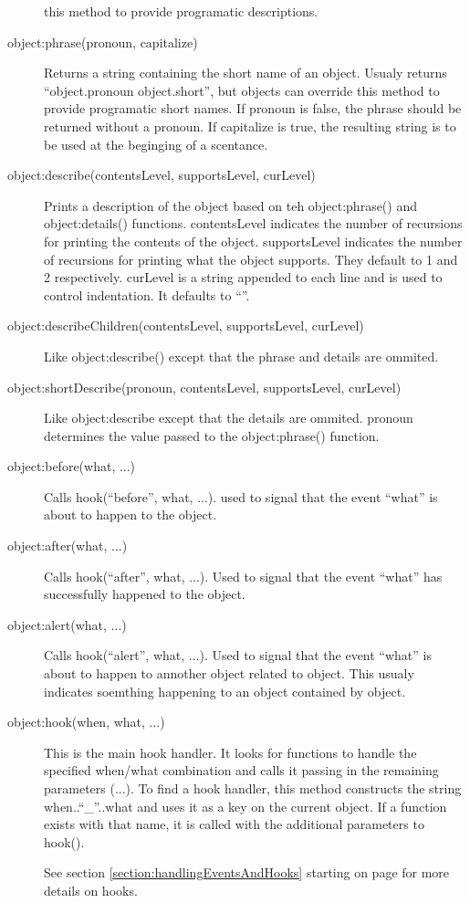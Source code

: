 \documentclass{book}
\newcommand{\myref}[1]{\ref{#1} starting on page \pageref{#1}}
\begin{document}
\begin{description}
  this method to provide programatic descriptions.
\item[object:phrase(pronoun, capitalize)] Returns a string containing
  the short name of an object. Usualy returns ``object.pronoun
  object.short'', but objects can override this method to provide
  programatic short names. If pronoun is false, the phrase should be
  returned without a pronoun. If capitalize is true, the resulting
  string is to be used at the beginging of a scentance.
\item[object:describe(contentsLevel, supportsLevel, curLevel)] Prints
  a description of the object based on teh object:phrase() and
  object:details() functions. contentsLevel indicates the number of
  recursions for printing the contents of the object. supportsLevel
  indicates the number of recursions for printing what the object
  supports. They default to 1 and 2 respectively. curLevel is a string
  appended to each line and is used to control indentation. It
  defaults to ``''.
\item[object:describeChildren(contentsLevel, supportsLevel, curLevel)]
  Like object:describe() except that the phrase and details are
  ommited.
\item[object:shortDescribe(pronoun, contentsLevel, supportsLevel,
  curLevel)] Like object:describe except that the details are
  ommited. pronoun determines the value passed to the object:phrase()
  function.
\item[object:before(what, ...)] Calls hook(``before'', what,
  ...). used to signal that the event ``what'' is about to happen to
  the object.
\item[object:after(what, ...)] Calls hook(``after'', what, ...). Used
  to signal that the event ``what'' has successfully happened to the object.
\item[object:alert(what, ...)] Calls hook(``alert'', what, ...). Used
  to signal that the event ``what'' is about to happen to annother object
  related to object. This usualy indicates soemthing happening to an
  object contained by object.
\item[object:hook(when, what, ...)] This is the main hook handler. It
  looks for functions to handle the specified when/what combination
  and calls it passing in the remaining parameters (...). To find a
  hook handler, this method constructs the string when..``\_''..what
  and uses it as a key on the current object. If a function exists
  with that name, it is called with the additional parameters to
  hook().

  See section \myref{section:handlingEventsAndHooks} for more details on hooks.
\end{description}
\end{document}

